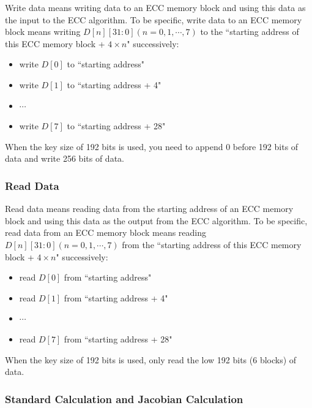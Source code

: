 \documentclass[main\_\_EN.tex]{subfiles}
\begin{document}
Write data means writing data to an ECC memory block and using this data as the input to the ECC algorithm. To be specific, write data to an ECC memory block means writing $D[n][31:0] (n=0, 1, \cdots, 7)$ to the ``starting address of this ECC memory block + $
4 \times n$" successively:

\begin{itemize}
    \item write $D[0]$ to ``starting address"
    \item write $D[1]$ to ``starting address + 4"
    \item $\cdots$
    \item write $D[7]$ to ``starting address + 28"
\end{itemize}

\begin{tiplisting}
When the key size of 192 bits is used, you need to append 0 before 192 bits of data and write 256 bits of data.
\end{tiplisting}

\subsubsection{Read Data}

Read data means reading data from the starting address of an ECC memory block and using this data as the output from the ECC algorithm. To be specific, read data from an ECC memory block means reading $D[n][31:0] (n=0, 1, \cdots, 7)$ from the ``starting address of this ECC memory block + 
$4 \times n$" successively:
\begin{itemize}
    \item read $D[0]$ from ``starting address"
    \item read $D[1]$ from ``starting address + 4"
    \item $\cdots$
    \item read $D[7]$ from ``starting address + 28"
\end{itemize}

\begin{tiplisting}
When the key size of 192 bits is used, only read the low 192 bits (6 blocks) of data.
\end{tiplisting}


\subsubsection{Standard Calculation and Jacobian Calculation}
\end{document}
